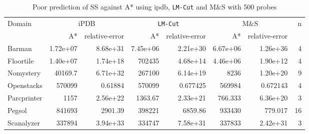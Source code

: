 

\begin{table}[!htb]
\footnotesize
\centering
\caption{Poor prediction of SS against A* using ipdb, \texttt{LM-Cut} and M$\&$S with 500 probes}
\label{tb:ipdb_lmcut_mands}
\begin{tabular}{lrrrrrrr}
\hline
\multirow{2}{*}{Domain} & \multicolumn{2}{c}{iPDB} & \multicolumn{2}{c}{\texttt{LM-Cut}} & \multicolumn{2}{c}{M$\&$S} & \multirow{2}{*}{n} \\ \cline{2-7}
                     & A*          & relative-error         & A*                & relative-error                & A*           & relative-error          &                    \\ \hline
Barman               & 1.72e+07    & 8.68e+31   & 7.45e+06          & 2.21e+30          & 6.67e+06     & 1.26e+36    & 4                  \\
Floortile            & 1.40e+07    & 1.74e+18   & 702435            & 4.68e+14          & 4.46e+06     & 1.90e+12    & 4                  \\
Nomystery            & 40169.7     & 6.71e+32   & 267100            & 6.14e+19          & 8236         & 1.20e+20    & 9                  \\
Openstacks           & 570099      & 0.61884    & 570099            & 0.677425          & 569984       & 0.672143    & 4                  \\
Parcprinter          & 1157        & 2.56e+22   & 1363.67           & 2.33e+21          & 766.333      & 6.36e+20    & 3                  \\
Pegsol               & 841693      & 2901.39    & 398221            & 6859.86           & 933430       & 779.017     & 16                 \\
Scanalyzer           & 337894      & 3.94e+33   & 334747            & 7.58e+31          & 337833       & 2.42e+31    & 3                  \\

\end{tabular}
\end{table}

